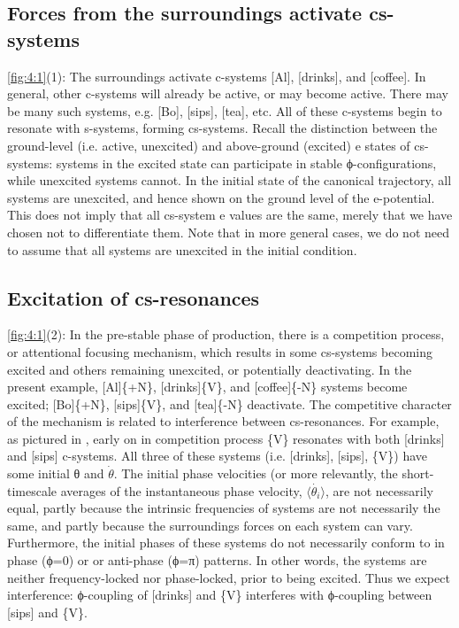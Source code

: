 \subsection{Forces from the surroundings activate cs-systems} 

\ref{fig:4:1}(1): The surroundings activate c-systems [Al], [drinks], and [coffee]. In general, other c-systems will already be active, or may become active. There may be many such systems, e.g. [Bo], [sips], [tea], etc. All of these c-systems begin to resonate with s-systems, forming cs-systems. Recall the distinction between the ground-level (i.e. active, unexcited) and above-ground (excited) e states of cs-systems: systems in the excited state can participate in stable ϕ-configurations, while unexcited systems cannot. In the initial state of the canonical trajectory, all systems are unexcited, and hence shown on the ground level of the e-potential. This does not imply that all cs-system e values are the same, merely that we have chosen not to differentiate them. Note that in more general cases, we do not need to assume that all systems are unexcited in the initial condition.

\subsection{Excitation of cs-resonances}

\ref{fig:4:1}(2): In the pre-stable phase of production, there is a competition process, or attentional focusing mechanism, which results in some cs-systems becoming excited and others remaining unexcited, or potentially deactivating. In the present example, [Al]\{+N\}, [drinks]\{V\}, and [coffee]\{-N\} systems become excited; [Bo]\{+N\}, [sips]\{V\}, and [tea]\{-N\} deactivate. The competitive character of the mechanism is related to interference between cs-resonances. For example, as pictured in {}, early on in competition process \{V\} resonates with both [drinks] and [sips] c-systems. All three of these systems (i.e. [drinks], [sips], \{V\}) have some initial θ and $\dot{\theta} $. The initial phase velocities (or more relevantly, the short-timescale averages of the instantaneous phase velocity, $\langle\dot{\theta_i}\rangle$, are not necessarily equal, partly because the intrinsic frequencies of systems are not necessarily the same, and partly because the surroundings forces on each system can vary. Furthermore, the initial phases of these systems do not necessarily conform to in phase (ϕ=0) or or anti-phase (ϕ=π) patterns. In other words, the systems are neither frequency-locked nor phase-locked, prior to being excited. Thus we expect interference: ϕ{}-coupling of [drinks] and \{V\} interferes with ϕ{}-coupling between [sips] and \{V\}.

